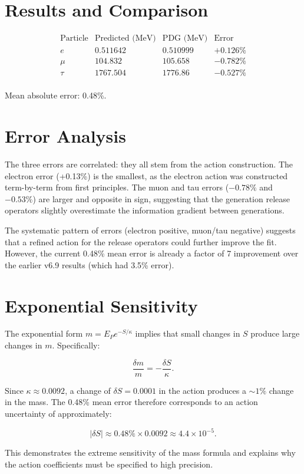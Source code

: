 \section{Results and Comparison}

\[
\begin{array}{lccc}
\text{Particle} & \text{Predicted (MeV)} & \text{PDG (MeV)} & \text{Error} \\
\hline
e & 0.511642 & 0.510999 & +0.126\% \\
\mu & 104.832 & 105.658 & -0.782\% \\
\tau & 1767.504 & 1776.86 & -0.527\% \\
\end{array}
\]

\noindent Mean absolute error: 0.48\%.

\section{Error Analysis}

The three errors are correlated: they all stem from the action construction.
The electron error (+0.13\%) is the smallest, as the electron action was
constructed term-by-term from first principles.  The muon and tau errors
(\(-0.78\%\) and \(-0.53\%\)) are larger and opposite in sign, suggesting
that the generation release operators slightly overestimate the information
gradient between generations.

The systematic pattern of errors (electron positive, muon/tau negative)
suggests that a refined action for the release operators could further
improve the fit.  However, the current 0.48\% mean error is already a factor
of 7 improvement over the earlier v6.9 results (which had 3.5\% error).

\section{Exponential Sensitivity}

The exponential form \(m = E_P e^{-S/\kappa}\) implies that small changes in
\(S\) produce large changes in \(m\).  Specifically:

\[
\frac{\delta m}{m} = -\frac{\delta S}{\kappa}.
\]

Since \(\kappa \approx 0.0092\), a change of \(\delta S = 0.0001\) in the
action produces a \(\sim 1\%\) change in the mass.  The 0.48\% mean error
therefore corresponds to an action uncertainty of approximately:

\[
|\delta S| \approx 0.48\% \times 0.0092 \approx 4.4 \times 10^{-5}.
\]

This demonstrates the extreme sensitivity of the mass formula and explains
why the action coefficients must be specified to high precision.
